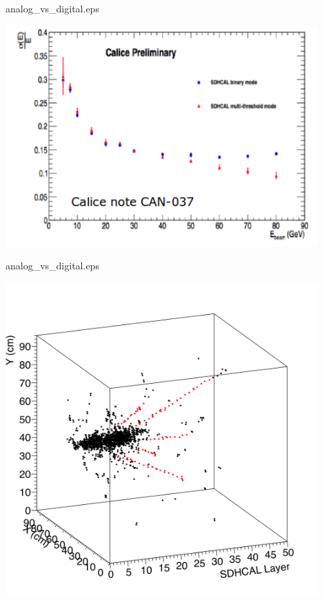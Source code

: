 \documentclass[10pt]{beamer}
\begin{document}
\begin{frame}{analog\_vs\_digital.eps}
    \centerline{\includegraphics[width=0.9\textwidth]{images/Beam2012Resolution}}
\end{frame}
\begin{frame}{analog\_vs\_digital.eps}
    \centerline{\includegraphics[width=0.9\textwidth]{images/Beam2012Hough}}
\end{frame}
\end{document}
